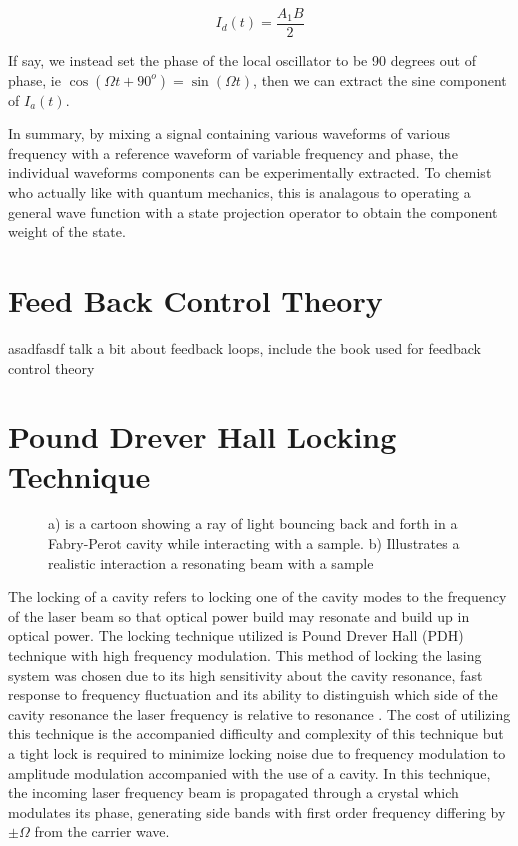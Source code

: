 \documentclass[11pt,a4paper]{book}
\newcommand{\imginput}[1]{} %
\begin{document}
			\begin{equation}
				I_d(t) = \dfrac{A_1 B}{2}
			\end{equation}	
		
			If say, we instead set the phase of the local oscillator to be 90 degrees out of phase, ie $\cos(\Omega t + 90^o)=\sin(\Omega t)$, then we can extract the sine component of $I_a(t)$.
			
			In summary, by mixing a signal containing various waveforms of various frequency with a reference waveform of variable frequency and phase, the individual waveforms components can be experimentally extracted. To chemist who actually like with quantum mechanics, this is analagous to operating a general wave function with a state projection operator to obtain the component weight of the state.

	\section{Feed Back Control Theory}
		\label{sec:Feed Back Control Theory}
		asadfasdf talk a bit about feedback loops, include the book used for feedback control theory

	\section{Pound Drever Hall Locking Technique}
		\label{sec:Pound Drever Hall Locking Technique}
		
		\begin{figure} [!ht]
			\centering
			\def\svgwidth{\columnwidth}
			\resizebox{160mm}{!}{\imginput{images/PDH-setup.pdf_tex}}
			\label{fig:PDHSetup}
			\caption{a) is a cartoon showing a ray of light bouncing back and forth in a Fabry-Perot cavity while interacting with a sample. b) Illustrates a realistic interaction a resonating beam with a sample }
		\end{figure}
		
		The locking of a cavity refers to locking one of the cavity modes to the frequency of the laser beam so that optical power build may resonate and build up in optical power.
		The locking technique utilized is Pound Drever Hall (PDH) technique with high frequency modulation. This method of locking the lasing system was chosen due to its high sensitivity about the cavity resonance, fast response to frequency fluctuation and its ability to distinguish which side of the cavity resonance the laser frequency is relative to resonance \cite{PDH Intro}. The cost of utilizing this technique is the accompanied difficulty and complexity of this technique but a tight lock is required to minimize locking noise due to frequency modulation to amplitude modulation accompanied with the use of a cavity. In this technique, the incoming laser frequency beam is propagated through a crystal which modulates its phase, generating side bands with first order frequency differing by $\pm \Omega$ from the carrier wave.
		
\end{document}
